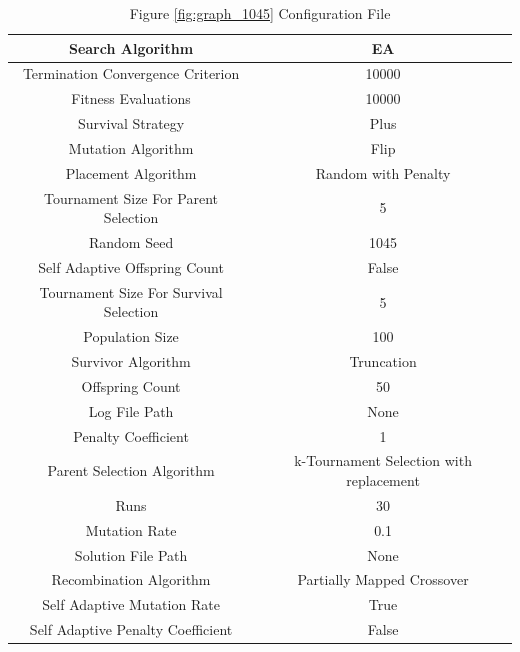 \documentclass{standalone}
\begin{document}
\begin{table}[!htb]
	\centering
	\caption{Figure \ref{fig:graph_1045} Configuration File}
	\label{tab:graph_1045}
	\begin{tabular}{| c | c |}
		\hline
		Search Algorithm		& EA		 \\
		\hline
		Termination Convergence Criterion		& 10000		 \\
		\hline
		Fitness Evaluations		& 10000		 \\
		\hline
		Survival Strategy		& Plus		 \\
		\hline
		Mutation Algorithm		& Flip		 \\
		\hline
		Placement Algorithm		& Random with Penalty		 \\
		\hline
		Tournament Size For Parent Selection		& 5		 \\
		\hline
		Random Seed		& 1045		 \\
		\hline
		Self Adaptive Offspring Count		& False		 \\
		\hline
		Tournament Size For Survival Selection		& 5		 \\
		\hline
		Population Size		& 100		 \\
		\hline
		Survivor Algorithm		& Truncation		 \\
		\hline
		Offspring Count		& 50		 \\
		\hline
		Log File Path		& None		 \\
		\hline
		Penalty Coefficient		& 1		 \\
		\hline
		Parent Selection Algorithm		& k-Tournament Selection with replacement		 \\
		\hline
		Runs		& 30		 \\
		\hline
		Mutation Rate		& 0.1		 \\
		\hline
		Solution File Path		& None		 \\
		\hline
		Recombination Algorithm		& Partially Mapped Crossover		 \\
		\hline
		Self Adaptive Mutation Rate		& True		 \\
		\hline
		Self Adaptive Penalty Coefficient		& False		 \\
		\hline
	\end{tabular}
\end{table}
\end{document}
